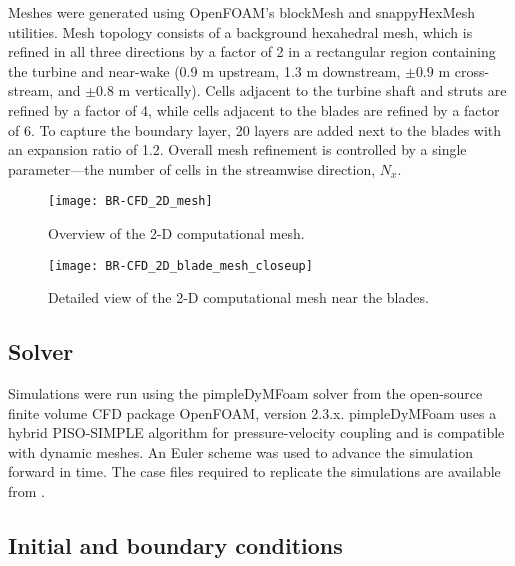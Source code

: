Meshes were generated using OpenFOAM's blockMesh and snappyHexMesh utilities.
Mesh topology consists of a background hexahedral mesh, which is refined in all
three directions by a factor of 2 in a rectangular region containing the turbine
and near-wake (0.9 m upstream, 1.3 m downstream, $\pm 0.9$ m cross-stream, and
$\pm 0.8$ m vertically). Cells adjacent to the turbine shaft and struts are
refined by a factor of 4, while cells adjacent to the blades are refined by a
factor of 6. To capture the boundary layer, 20 layers are added next to the
blades with an expansion ratio of 1.2. Overall mesh refinement is controlled by
a single parameter---the number of cells in the streamwise direction, $N_x$.

\begin{figure}
    \centering

    \texttt{[image: BR-CFD\_2D\_mesh]}

    \caption{Overview of the 2-D computational mesh.}

    \label{fig:2d-br-mesh}
\end{figure}


\begin{figure}
    \centering

    \texttt{[image: BR-CFD\_2D\_blade\_mesh\_closeup]}

    \caption{Detailed view of the 2-D computational mesh near the blades.}

    \label{fig:blade-mesh}
\end{figure}


\subsection{Solver}

Simulations were run using the pimpleDyMFoam solver from the open-source finite
volume CFD package OpenFOAM, version 2.3.x. pimpleDyMFoam uses a hybrid
PISO-SIMPLE algorithm for pressure-velocity coupling and is compatible with
dynamic meshes. An Euler scheme was used to advance the simulation forward in
time. The case files required to replicate the simulations are available from
\cite{Bachant2016-UNH-RVAT-2D-OpenFOAM-SST, Bachant2016-UNH-RVAT-2D-OpenFOAM-SA,
Bachant2016-UNH-RVAT-3D-OpenFOAM-SST, Bachant2016-UNH-RVAT-3D-OpenFOAM-SA}.


\subsection{Initial and boundary conditions}

